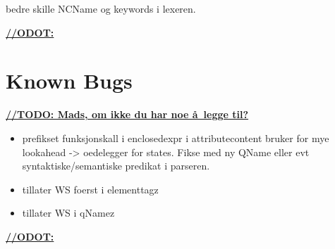 bedre skille NCName og keywords i lexeren.

\underline{\textbf{\LARGE //ODOT:}}

\section{Known Bugs}
\label{sect:future:knownBugs}

\underline{\textbf{\LARGE //TODO: Mads, om ikke du har noe \aa~legge til?}}
\begin{itemize}
		\item prefikset funksjonskall i enclosedexpr i attributecontent bruker for mye lookahead -> oedelegger for states. Fikse med ny QName eller evt syntaktiske/semantiske predikat i parseren.
		\item tillater WS foerst i elementtagz
		\item tillater WS i qNamez
	\end{itemize}

\underline{\textbf{\LARGE //ODOT:}}
